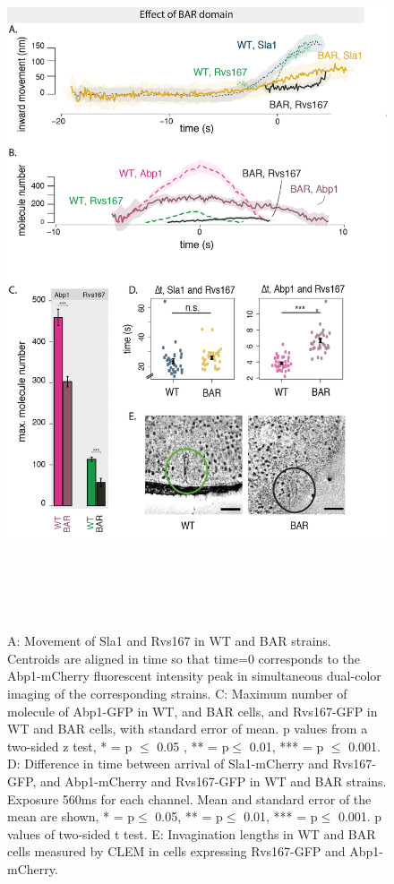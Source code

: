 \begin{figure}
	\centering
	\includegraphics[width=21cm,height=21cm,keepaspectratio]{figures/results_final/delsh3_6}
	\caption [Effect of the Rvs167 SH3 deletion]
	{A: Movement of Sla1 and Rvs167 in WT and BAR strains. Centroids are aligned in time so that time=0 corresponds to the Abp1-mCherry fluorescent intensity peak in simultaneous dual-color imaging of the corresponding strains. 
	C: Maximum number of molecule of Abp1-GFP in WT, and BAR cells, and Rvs167-GFP in WT and BAR cells, with standard error of mean. p values from a two-sided z test, * = p $\leq$ 0.05 , ** = p$\leq$ 0.01, *** = p $\leq$ 0.001. 
	D: Difference in time between arrival of Sla1-mCherry and Rvs167-GFP, and Abp1-mCherry and Rvs167-GFP in WT and BAR strains. Exposure 560ms for each channel. Mean and standard error of the mean are shown, * = p$\leq$ 0.05, ** = p$\leq$ 0.01, *** = p$\leq$ 0.001. p values of two-sided t test.
	E: Invagination lengths in WT and BAR cells measured by CLEM in cells expressing Rvs167-GFP and Abp1-mCherry. 
	\label{fig2_sh3del}}

	\end{figure}
	\vspace{5mm}
	
